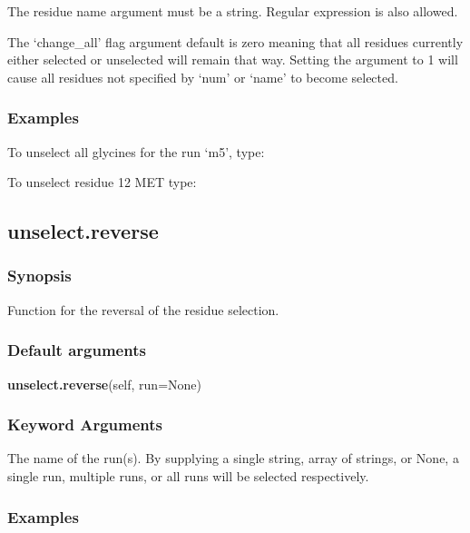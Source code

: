 The residue name argument must be a string.  Regular expression is also allowed.

The `change\_all' flag argument default is zero meaning that all residues currently either
selected or unselected will remain that way.  Setting the argument to 1 will cause all
residues not specified by `num' or `name' to become selected.


\subsubsection{Examples}

To unselect all glycines for the run `m5', type:


To unselect residue 12 MET type:





\newpage

\subsection{unselect.reverse}


\subsubsection{Synopsis}

Function for the reversal of the residue selection.

\subsubsection{Default arguments}

\textsf{\textbf{unselect.reverse}(self, run=None)}


\subsubsection{Keyword Arguments}

  The name of the run(s).  By supplying a single string, array of strings, or None, a single run, multiple runs, or all runs will be selected respectively.

\subsubsection{Examples}

